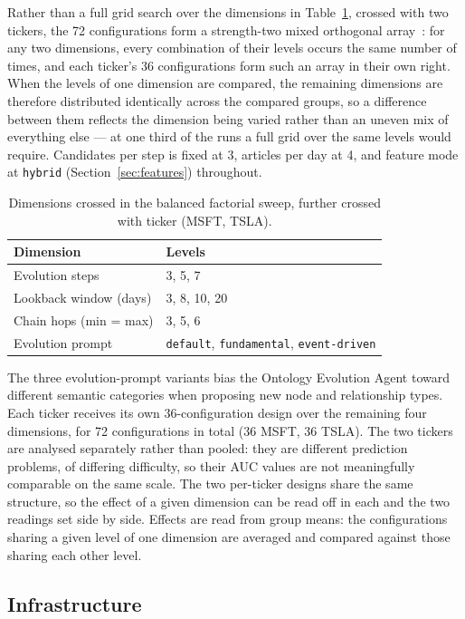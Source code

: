 Rather than a full grid search over the dimensions in Table~\ref{tab:sweep-dims}, crossed with two
tickers, the 72 configurations form a strength-two mixed orthogonal
array~\citep[Definition~1.2]{lin2025orthogonalarrays}: for any two dimensions, every combination of their levels
occurs the same number of times, and each ticker's 36 configurations form such an array in their
own right.
When the levels of one dimension are compared, the remaining dimensions are therefore distributed
identically across the compared groups, so a difference between them reflects the dimension being
varied rather than an uneven mix of everything else --- at one third of the runs a full grid over
the same levels would require.
Candidates per step is fixed at 3, articles per day at 4, and feature mode at \texttt{hybrid}
(Section~\ref{sec:features}) throughout.

\begin{table}[t]
\centering
\begin{tabular}{ll}
\toprule
Dimension & Levels \\
\midrule
Evolution steps & 3, 5, 7 \\
Lookback window (days) & 3, 8, 10, 20 \\
Chain hops (min = max) & 3, 5, 6 \\
Evolution prompt & \texttt{default}, \texttt{fundamental}, \texttt{event-driven} \\
\bottomrule
\end{tabular}
\caption{Dimensions crossed in the balanced factorial sweep, further crossed with ticker
(MSFT, TSLA).}
\label{tab:sweep-dims}
\end{table}

The three evolution-prompt variants bias the Ontology Evolution Agent toward different semantic
categories when proposing new node and relationship types.
Each ticker receives its own 36-configuration design over the remaining four dimensions, for 72
configurations in total (36 MSFT, 36 TSLA).
The two tickers are analysed separately rather than pooled: they are different prediction problems,
of differing difficulty, so their AUC values are not meaningfully comparable on the same scale.
The two per-ticker designs share the same structure, so the effect of a given dimension can be read
off in each and the two readings set side by side.
Effects are read from group means: the configurations sharing a given level of one dimension are
averaged and compared against those sharing each other level.

\subsection{Infrastructure}
\label{sec:infrastructure}

